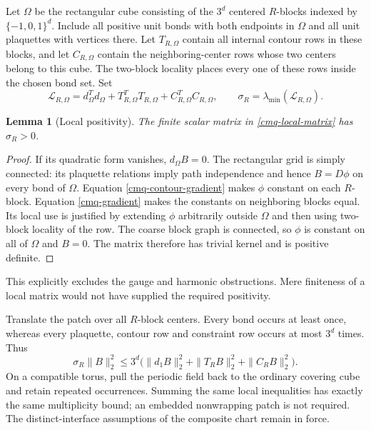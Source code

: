 \documentclass[11pt]{article}
\newtheorem{lemma}[theorem]{Lemma}
\theoremstyle{remark}
\begin{document}
Let $\Omega$ be the rectangular cube consisting of the $3^d$
centered $R$-blocks indexed by $\{-1,0,1\}^d$. Include all
positive unit bonds with both endpoints in $\Omega$ and all
unit plaquettes with vertices there. Let $T_{R,\Omega}$ contain
all internal contour rows in these blocks, and let
$C_{R,\Omega}$ contain the neighboring-center rows whose two
centers belong to this cube. The two-block locality places every
one of these rows inside the chosen bond set. Set
\begin{equation}
 \mathcal L_{R,\Omega}
 =d_\Omega^Td_\Omega+T_{R,\Omega}^TT_{R,\Omega}
                         +C_{R,\Omega}^TC_{R,\Omega},
 \qquad \sigma_R=\lambda_{\min}(\mathcal L_{R,\Omega}).
 \label{cmq-local-matrix}
\end{equation}

\begin{lemma}[Local positivity]
\label{cmq-local-positivity}
The finite scalar matrix in \eqref{cmq-local-matrix} has
$\sigma_R>0$.
\end{lemma}
\begin{proof}
If its quadratic form vanishes, $d_\Omega B=0$. The rectangular
grid is simply connected: its plaquette relations imply path
independence and hence $B=D\phi$ on every bond of $\Omega$.
Equation \eqref{cmq-contour-gradient} makes $\phi$ constant on
each $R$-block. Equation \eqref{cmq-gradient} makes the constants
on neighboring blocks equal. Its local use is justified by
extending $\phi$ arbitrarily outside $\Omega$ and then using
two-block locality of the row. The coarse block graph is
connected, so $\phi$ is constant on all of $\Omega$ and $B=0$.
The matrix therefore has trivial kernel and is positive definite.
\end{proof}

This explicitly excludes the gauge and harmonic obstructions.
Mere finiteness of a local matrix would not have supplied the
required positivity.

Translate the patch over all $R$-block centers. Every bond occurs
at least once, whereas every plaquette, contour row and
constraint row occurs at most $3^d$ times. Thus
\begin{equation}
 \sigma_R\|B\|_2^2
 \leq3^d\big(\|d_1B\|_2^2+\|T_RB\|_2^2+\|C_RB\|_2^2\big).
 \label{cmq-global-patch}
\end{equation}
On a compatible torus, pull the periodic field back to the
ordinary covering cube and retain repeated occurrences. Summing
the same local inequalities has exactly the same multiplicity
bound; an embedded nonwrapping patch is not required. The
distinct-interface assumptions of the composite chart remain
in force.
\end{document}
